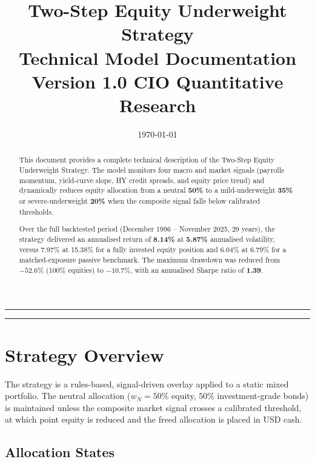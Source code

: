 \documentclass[11pt, a4paper]{article}
\title{%
  \vspace{-1cm}
  {\Large\bfseries Two-Step Equity Underweight Strategy}\\[0.4em]
  {\large Technical Model Documentation}\\[0.8em]
  {\normalsize\textcolor{cgray}{Version 1.0 \textbar{} CIO Quantitative Research}}
}
\author{}
\date{\today}
\begin{document}
\maketitle
\thispagestyle{empty}
\vspace{-1em}
\noindent\rule{\linewidth}{0.8pt}

\begin{abstract}
\noindent
This document provides a complete technical description of the Two-Step Equity
Underweight Strategy. The model monitors four macro and market signals
(payrolls momentum, yield-curve slope, HY credit spreads, and equity price
trend) and dynamically reduces equity allocation from a neutral \textbf{50\%}
to a mild-underweight \textbf{35\%} or severe-underweight \textbf{20\%}
when the composite signal falls below calibrated thresholds.

Over the full backtested period (December 1996 -- November 2025, 29 years),
the strategy delivered an annualised return of \textbf{8.14\%} at
\textbf{5.87\%} annualised volatility, versus 7.97\% at 15.38\% for a fully
invested equity position and 6.04\% at 6.79\% for a matched-exposure passive
benchmark. The maximum drawdown was reduced from $-52.6\%$ (100\% equities)
to $-10.7\%$, with an annualised Sharpe ratio of \textbf{1.39}.
\end{abstract}

\noindent\rule{\linewidth}{0.4pt}
\tableofcontents
\clearpage

\section{Strategy Overview}
\label{sec:overview}

The strategy is a rules-based, signal-driven overlay applied to a static
mixed portfolio. The neutral allocation ($w_N = 50\%$ equity, $50\%$
investment-grade bonds) is maintained unless the composite market signal
crosses a calibrated threshold, at which point equity is reduced and the
freed allocation is placed in USD cash.

\subsection{Allocation States}
\end{document}
